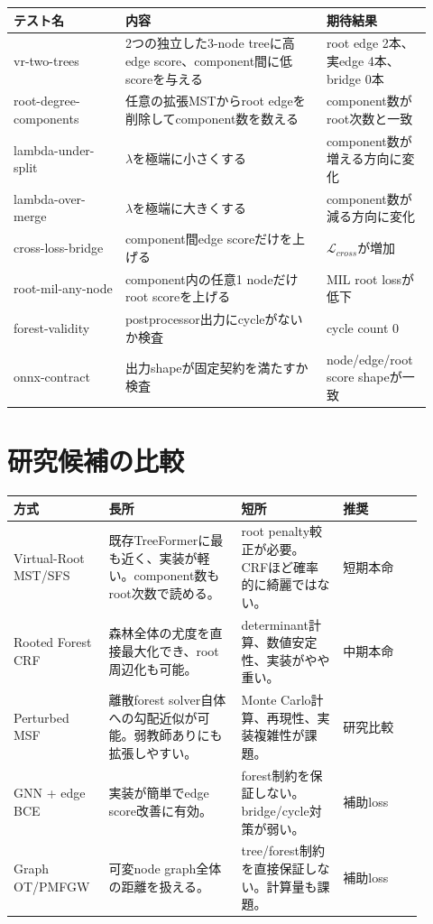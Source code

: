 \documentclass[11pt,a4paper]{article}
\begin{document}
\begin{longtable}{p{0.25\linewidth}p{0.45\linewidth}p{0.22\linewidth}}
\toprule
テスト名 & 内容 & 期待結果 \\
\midrule
vr-two-trees & 2つの独立した3-node treeに高edge score、component間に低scoreを与える & root edge 2本、実edge 4本、bridge 0本 \\
root-degree-components & 任意の拡張MSTからroot edgeを削除してcomponent数を数える & component数がroot次数と一致 \\
lambda-under-split & $\lambda$を極端に小さくする & component数が増える方向に変化 \\
lambda-over-merge & $\lambda$を極端に大きくする & component数が減る方向に変化 \\
cross-loss-bridge & component間edge scoreだけを上げる & $\mathcal{L}_{cross}$が増加 \\
root-mil-any-node & component内の任意1 nodeだけroot scoreを上げる & MIL root lossが低下 \\
forest-validity & postprocessor出力にcycleがないか検査 & cycle count 0 \\
onnx-contract & 出力shapeが固定契約を満たすか検査 & node/edge/root score shapeが一致 \\
\bottomrule
\end{longtable}

\section{研究候補の比較}
\begin{longtable}{p{0.19\linewidth}p{0.30\linewidth}p{0.23\linewidth}p{0.18\linewidth}}
\toprule
方式 & 長所 & 短所 & 推奨 \\
\midrule
Virtual-Root MST/SFS & 既存TreeFormerに最も近く、実装が軽い。component数もroot次数で読める。 & root penalty較正が必要。CRFほど確率的に綺麗ではない。 & 短期本命 \\
Rooted Forest CRF & 森林全体の尤度を直接最大化でき、root周辺化も可能。 & determinant計算、数値安定性、実装がやや重い。 & 中期本命 \\
Perturbed MSF & 離散forest solver自体への勾配近似が可能。弱教師ありにも拡張しやすい。 & Monte Carlo計算、再現性、実装複雑性が課題。 & 研究比較 \\
GNN + edge BCE & 実装が簡単でedge score改善に有効。 & forest制約を保証しない。bridge/cycle対策が弱い。 & 補助loss \\
Graph OT/PMFGW & 可変node graph全体の距離を扱える。 & tree/forest制約を直接保証しない。計算量も課題。 & 補助loss \\
\bottomrule
\end{longtable}
\end{document}

